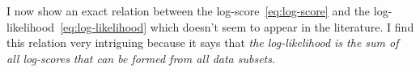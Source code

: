 \documentclass[\ifafour a4paper,12pt,\else a5paper,10pt,\fi%
onecolumn,oneside,article,%
british%
]{memoir}
\theoremstyle{remark}
\theoremstyle{innote}
\newcommand*{\citep}{\parencites}
\newcommand*{\p}{\mathrm{P}}%
\renewcommand*{\|}[1][]{\nonscript\,#1\vert\nonscript\;\mathopen{}}
\newcommand*{\yK}{K}
\begin{document}
\bigskip

I now show an exact relation between the log-score~\eqref{eq:log-score} and
the log-likelihood~\eqref{eq:log-likelihood} which doesn't seem to appear
in the literature. I find this relation very intriguing because it says
that \emph{the log-likelihood is the sum of all log-scores that can be
  formed from all data subsets}.



\bigskip
\end{document}
